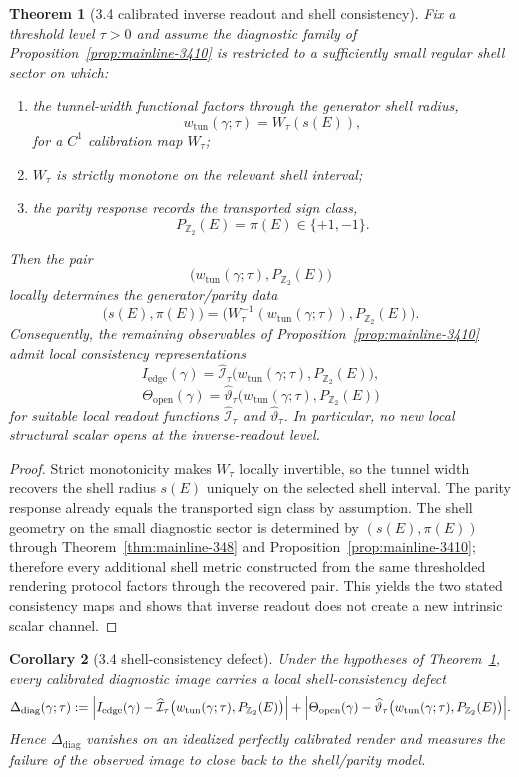 \documentclass[12pt,a4paper]{article}
\newtheorem{theorem}{Theorem}[section]
\newtheorem{corollary}[theorem]{Corollary}
\begin{document}
\begin{theorem}[3.4 calibrated inverse readout and shell consistency]
\label{thm:mainline-3411}
Fix a threshold level $\tau>0$ and assume the diagnostic family of Proposition~\ref{prop:mainline-3410} is restricted to a sufficiently small regular shell sector on which:
\begin{enumerate}[label=(\roman*)]
 \item the tunnel-width functional factors through the generator shell radius,
 \[
 w_{\mathrm{tun}}(\gamma;\tau)=W_\tau(s(E)),
 \]
 for a $C^1$ calibration map $W_\tau$;
 \item $W_\tau$ is strictly monotone on the relevant shell interval;
 \item the parity response records the transported sign class,
 \[
 P_{\mathbb Z_2}(E)=\pi(E)\in\{+1,-1\}.
 \]
\end{enumerate}
Then the pair
\[
 \bigl(w_{\mathrm{tun}}(\gamma;\tau),P_{\mathbb Z_2}(E)\bigr)
\]
locally determines the generator/parity data
\[
 \bigl(s(E),\pi(E)\bigr)
 =\bigl(W_\tau^{-1}(w_{\mathrm{tun}}(\gamma;\tau)),P_{\mathbb Z_2}(E)\bigr).
\]
Consequently, the remaining observables of Proposition~\ref{prop:mainline-3410} admit local consistency representations
\[
 I_{\mathrm{edge}}(\gamma)=\widehat{\mathcal I}_\tau\bigl(w_{\mathrm{tun}}(\gamma;\tau),P_{\mathbb Z_2}(E)\bigr),
\]
\[
 \Theta_{\mathrm{open}}(\gamma)=\widehat{\vartheta}_\tau\bigl(w_{\mathrm{tun}}(\gamma;\tau),P_{\mathbb Z_2}(E)\bigr)
\]
for suitable local readout functions $\widehat{\mathcal I}_\tau$ and $\widehat{\vartheta}_\tau$. In particular, no new local structural scalar opens at the inverse-readout level.
\end{theorem}

\begin{proof}
Strict monotonicity makes $W_\tau$ locally invertible, so the tunnel width recovers the shell radius $s(E)$ uniquely on the selected shell interval. The parity response already equals the transported sign class by assumption. The shell geometry on the small diagnostic sector is determined by $(s(E),\pi(E))$ through Theorem~\ref{thm:mainline-348} and Proposition~\ref{prop:mainline-3410}; therefore every additional shell metric constructed from the same thresholded rendering protocol factors through the recovered pair. This yields the two stated consistency maps and shows that inverse readout does not create a new intrinsic scalar channel.
\end{proof}

\begin{corollary}[3.4 shell-consistency defect]
\label{cor:mainline-3411-defect}
Under the hypotheses of Theorem~\ref{thm:mainline-3411}, every calibrated diagnostic image carries a local shell-consistency defect
\[
 \Delta_{\mathrm{diag}}(\gamma;\tau)
 :=\Bigl|I_{\mathrm{edge}}(\gamma)-\widehat{\mathcal I}_\tau\bigl(w_{\mathrm{tun}}(\gamma;\tau),P_{\mathbb Z_2}(E)\bigr)\Bigr|
 +\Bigl|\Theta_{\mathrm{open}}(\gamma)-\widehat{\vartheta}_\tau\bigl(w_{\mathrm{tun}}(\gamma;\tau),P_{\mathbb Z_2}(E)\bigr)\Bigr|.
\]
Hence $\Delta_{\mathrm{diag}}$ vanishes on an idealized perfectly calibrated render and measures the failure of the observed image to close back to the shell/parity model.
\end{corollary}
\end{document}
